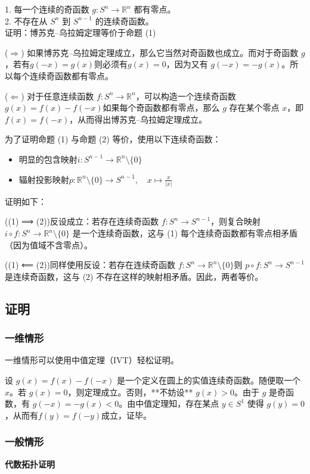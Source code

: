 1. 每一个连续的奇函数 $g : S^n \to \mathbb{R}^n$ 都有零点。\\
2. 不存在从 $S^n$ 到 $S^{n-1}$ 的连续奇函数。\\

证明：博苏克–乌拉姆定理等价于命题 (1)

($\Longrightarrow$) 如果博苏克–乌拉姆定理成立，那么它当然对奇函数也成立。而对于奇函数 $g$，若有$g(-x) = g(x)$则必须有$g(x) = 0$，因为又有 $g(-x) = -g(x)$。所以每个连续奇函数都有零点。

($\Longleftarrow$) 对于任意连续函数 $f : S^n \to \mathbb{R}^n$，可以构造一个连续奇函数$g(x) = f(x) - f(-x)$如果每个奇函数都有零点，那么 $g$ 存在某个零点 $x$，即$f(x) = f(-x)$，从而得出博苏克–乌拉姆定理成立。

为了证明命题 (1) 与命题 (2) 等价，使用以下连续奇函数：

\begin{itemize}
\item 明显的包含映射$i : S^{n-1} \to \mathbb{R}^n \setminus \{0\}$
\item 辐射投影映射$p : \mathbb{R}^n \setminus \{0\} \to S^{n-1}, \quad x \mapsto \frac{x}{|x|}$
\end{itemize}
证明如下：

((1) ⟹ (2))反设成立：若存在连续奇函数 $f : S^n \to S^{n-1}$，则复合映射 $i \circ f : S^n \to \mathbb{R}^n \setminus \{0\}$ 是一个连续奇函数，这与 (1) 每个连续奇函数都有零点相矛盾（因为值域不含零点）。

((1) ⟸ (2))同样使用反设：若存在连续奇函数 $f : S^n \to \mathbb{R}^n \setminus \{0\}$则 $p \circ f : S^n \to S^{n-1}$ 是连续奇函数，这与 (2) 不存在这样的映射相矛盾。因此，两者等价。
\subsection{证明}
\subsubsection{一维情形}
一维情形可以使用中值定理（IVT）轻松证明。

设 $g(x) = f(x) - f(-x)$ 是一个定义在圆上的实值连续奇函数。随便取一个 $x$。若 $g(x) = 0$，则定理成立。否则，**不妨设** $g(x) > 0$。由于 $g$ 是奇函数，有 $g(-x) = -g(x) < 0$。由中值定理知，存在某点 $y \in S^1$ 使得 $g(y) = 0$，从而有$f(y) = f(-y)$成立，证毕。
\subsubsection{一般情形}
\textbf{代数拓扑证明}


